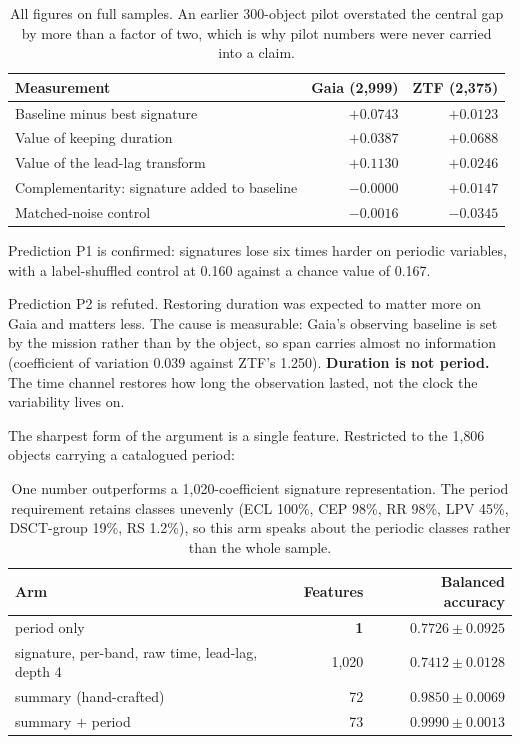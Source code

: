 \documentclass[11pt,a4paper]{report}
\begin{document}
\begin{table}[h]
\centering
\small
\begin{tabular}{lrr}
\toprule
Measurement & Gaia (2{,}999) & ZTF (2{,}375) \\
\midrule
Baseline minus best signature & $\mathbf{+0.0743}$ & $+0.0123$ \\
Value of keeping duration & $+0.0387$ & $\mathbf{+0.0688}$ \\
Value of the lead-lag transform & $\mathbf{+0.1130}$ & $+0.0246$ \\
Complementarity: signature added to baseline & $\mathbf{-0.0000}$ & $\mathbf{+0.0147}$ \\
Matched-noise control & $-0.0016$ & $-0.0345$ \\
\bottomrule
\end{tabular}
\caption{All figures on full samples. An earlier 300-object pilot overstated the central gap
by more than a factor of two, which is why pilot numbers were never carried into a claim.}
\end{table}

Prediction P1 is confirmed: signatures lose six times harder on periodic variables, with a
label-shuffled control at 0.160 against a chance value of 0.167.

Prediction P2 is refuted. Restoring duration was expected to matter more on Gaia and matters
less. The cause is measurable: Gaia's observing baseline is set by the mission rather than by
the object, so span carries almost no information (coefficient of variation 0.039 against
ZTF's 1.250). \textbf{Duration is not period.} The time channel restores how long the
observation lasted, not the clock the variability lives on.

The sharpest form of the argument is a single feature. Restricted to the 1{,}806 objects
carrying a catalogued period:

\begin{table}[h]
\centering
\small
\begin{tabular}{lrr}
\toprule
Arm & Features & Balanced accuracy \\
\midrule
period only & \textbf{1} & $\mathbf{0.7726 \pm 0.0925}$ \\
signature, per-band, raw time, lead-lag, depth 4 & 1{,}020 & $0.7412 \pm 0.0128$ \\
summary (hand-crafted) & 72 & $0.9850 \pm 0.0069$ \\
summary $+$ period & 73 & $\mathbf{0.9990 \pm 0.0013}$ \\
\bottomrule
\end{tabular}
\caption{One number outperforms a 1{,}020-coefficient signature representation. The period
requirement retains classes unevenly (ECL 100\%, CEP 98\%, RR 98\%, LPV 45\%, DSCT-group
19\%, RS 1.2\%), so this arm speaks about the periodic classes rather than the whole sample.}
\end{table}
\end{document}
